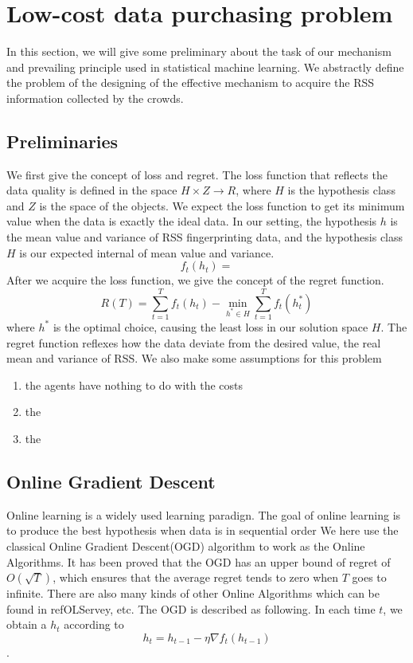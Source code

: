 \documentclass[10pt,conference,compsocconf,letterpaper]{IEEEtran}
\begin{document}
\section{Low-cost data purchasing problem}\label{probdef}
In this section, we will give some preliminary about the task of our mechanism and prevailing principle used in statistical machine learning. We abstractly define the problem of the designing of the effective mechanism to acquire the RSS information collected by the crowds. 

\subsection{Preliminaries}
We first give the concept of loss and regret. The loss function that reflects the data quality is defined in the space $H\times Z\to R$, where $H$ is the hypothesis class and $Z$ is the space of the objects. We expect the loss function to get its minimum value when the data is exactly the ideal data. In our setting, the hypothesis $h$ is the mean value and variance of RSS fingerprinting data, and the hypothesis class $H$ is our expected internal of mean value and  variance. 
\begin{equation}
f_t(h_t)=
\end{equation}
 After we acquire the loss function, we give the concept of the regret function.
\begin{equation}\label{def:reg}
R(T)=\sum_{t=1}^Tf_t(h_t)-\min_{h^*\in H}\sum_{t=1}^Tf_t(h^*_t)
\end{equation}
where $h^*$ is the optimal choice, causing the least loss in our solution space $H$. The regret function reflexes how the data deviate from the desired value, the real mean and variance of RSS. We also make some assumptions for this problem
\begin{enumerate}
\item the agents have nothing to do with the costs
\item the 
\item the 
\end{enumerate}


\subsection{Online Gradient Descent}
Online learning is a widely used learning paradign. The goal of online learning is to produce the best hypothesis when data is in sequential order
We here use the classical Online Gradient Descent(OGD) algorithm to work as the Online Algorithms. It has been proved that the OGD has an upper bound of regret of $O(\sqrt{T})$, which ensures that the average regret tends to zero when $T$ goes to infinite. There are also many kinds of other Online Algorithms which can be found in ref{OLServey}, etc. The OGD is described as following. In each time $t$, we obtain a $h_t$ according to
\begin{equation}
h_t=h_{t-1}-\eta \nabla f_t(h_{t-1})
\end{equation}.
\end{document}
